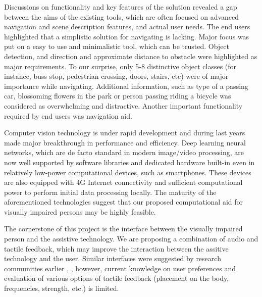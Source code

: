 \documentclass[10pt,conference,compsocconf]{IEEEtran}
\begin{document}
Discussions on functionality and key features of the solution revealed a gap between the aims of the existing tools, which are often focused on advanced navigation and scene description features, and actual user needs. The end users highlighted that a simplistic solution for navigating is lacking. 
Major focus was put on a easy to use and minimalistic tool, which can be trusted. Object detection, and direction and approximate distance to obstacle were highlighted as major requirements. To our surprise, only 5-8 distinctive object classes (for instance, buss stop, pedestrian crossing, doors, stairs, etc) were of major importance while navigating. Additional information, such as type of a passing car, blossoming flowers in the park or person passing riding a bicycle was considered as overwhelming and distractive. Another important functionality required by end users was navigation aid.


Computer vision technology is under rapid development and during last years made major breakthrough in performance and efficiency. Deep learning neural networks, which are de facto standard in modern image/video processing, are now well supported by software libraries and dedicated hardware built-in even in relatively low-power computational devices, such as smartphones. These devices are also equipped with 4G Internet connectivity and sufficient computational power to perform initial data processing locally. The maturity of the aforementioned technologies suggest that our proposed computational aid for visually impaired persons may be highly feasible. 


The cornerstone of this project is the interface between the visually impaired person and the assistive technology. We are proposing a combination of audio and tactile feedback, which may improve the interaction between the assitive technology and the user. Similar interfaces were suggested by research communities earlier \cite{Zientara}, \cite{Poggi}, however, current knowledge on user preferences and evaluation of various options of tactile feedback (placement on the body, frequencies, strength, etc.) is limited. 
\end{document}
